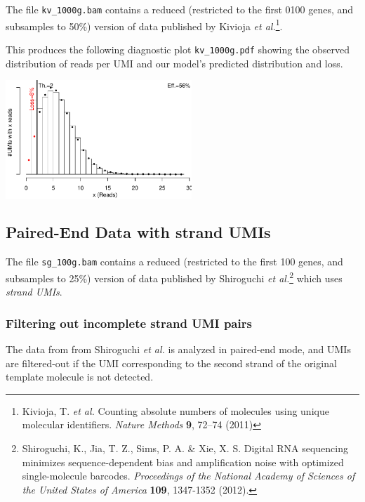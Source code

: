 \documentclass[10pt]{article}
\begin{document}
The file \texttt{kv\_1000g.bam} contains a reduced (restricted to the first 0100 genes, and subsamples to 50\%) version of data published by Kivioja \textit{et al.}\footnote{Kivioja, T. \textit{et al.} Counting absolute numbers of molecules using unique molecular identifiers. \textit{Nature Methods} \textbf{9}, 72–74 (2011)}.


This produces the following diagnostic plot \texttt{kv\_1000g.pdf} showing the observed distribution of reads per UMI and our model's predicted distribution and loss.

{\centering \includegraphics[width=7cm]{../examples/kv_1000g.pdf}\\}

\subsection{Paired-End Data with strand UMIs}

The file \texttt{sg\_100g.bam} contains a reduced (restricted to the first 100 genes, and subsamples to 25\%) version of data published by Shiroguchi \textit{et al.}\footnote{Shiroguchi, K., Jia, T. Z., Sims, P. A. \& Xie, X. S. Digital RNA sequencing minimizes sequence-dependent bias and amplification noise with optimized single-molecule barcodes. \textit{Proceedings of the National Academy of Sciences of the United States of America} \textbf{109}, 1347-1352 (2012).} which uses \emph{strand UMIs}.

\subsubsection*{Filtering out incomplete strand UMI pairs}

The data from from Shiroguchi \textit{et al.} is analyzed in paired-end mode, and UMIs are filtered-out if the UMI corresponding to the second strand of the original template molecule is not detected.

\end{document}
